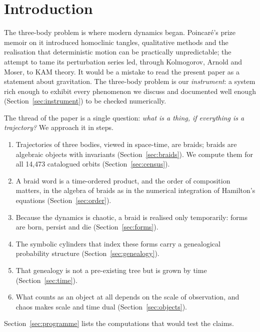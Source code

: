 \documentclass[11pt]{article}
\theoremstyle{remark}
\begin{document}
\tableofcontents

\section{Introduction}

The three-body problem is where modern dynamics began. Poincar\'e's prize memoir on it introduced homoclinic
tangles, qualitative methods and the realisation that deterministic motion can be practically unpredictable;
the attempt to tame its perturbation series led, through Kolmogorov, Arnold and Moser, to KAM theory. It
would be a mistake to read the present paper as a statement about gravitation. The three-body problem is our
\emph{instrument}: a system rich enough to exhibit every phenomenon we discuss and documented well enough
(Section~\ref{sec:instrument}) to be checked numerically.

The thread of the paper is a single question: \emph{what is a thing, if everything is a trajectory?} We
approach it in steps.
\begin{enumerate}[leftmargin=*]
\item Trajectories of three bodies, viewed in space-time, are braids; braids are algebraic objects with
      invariants (Section~\ref{sec:braids}). We compute them for all 14{,}473 catalogued orbits
      (Section~\ref{sec:census}).
\item A braid word is a time-ordered product, and the order of composition matters, in the algebra of braids
      as in the numerical integration of Hamilton's equations (Section~\ref{sec:order}).
\item Because the dynamics is chaotic, a braid is realised only temporarily: forms are born, persist and die
      (Section~\ref{sec:forms}).
\item The symbolic cylinders that index these forms carry a genealogical probability structure
      (Section~\ref{sec:genealogy}).
\item That genealogy is not a pre-existing tree but is grown by time (Section~\ref{sec:time}).
\item What counts as an object at all depends on the scale of observation, and chaos makes scale and time
      dual (Section~\ref{sec:objects}).
\end{enumerate}
Section~\ref{sec:programme} lists the computations that would test the claims.
\end{document}
